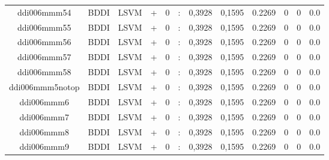 \documentclass[a4paper]{article}
\begin{document}
\begin{landscape}
\begin{center}
\begin{tabular}{ |c|c|c|c|c|c|c|c|c|c|c|c|}
 	
 
 	
 		
 		\small{ ddi006mmm54 } & BDDI & LSVM & +  &  0 &  :  &  0,3928 & 0,1595 & 0.2269  &  0 & 0 & 0.0 \\
 		

 	
 
 	
 		
 		\small{ ddi006mmm55 } & BDDI & LSVM & +  &  0 &  :  &  0,3928 & 0,1595 & 0.2269  &  0 & 0 & 0.0 \\
 		

 	
 
 	
 		
 		\small{ ddi006mmm56 } & BDDI & LSVM & +  &  0 &  :  &  0,3928 & 0,1595 & 0.2269  &  0 & 0 & 0.0 \\
 		

 	
 
 	
 		
 		\small{ ddi006mmm57 } & BDDI & LSVM & +  &  0 &  :  &  0,3928 & 0,1595 & 0.2269  &  0 & 0 & 0.0 \\
 		

 	
 
 	
 		
 		\small{ ddi006mmm58 } & BDDI & LSVM & +  &  0 &  :  &  0,3928 & 0,1595 & 0.2269  &  0 & 0 & 0.0 \\
 		

 	
 
 	
 		
 		\small{ ddi006mmm5notop } & BDDI & LSVM & +  &  0 &  :  &  0,3928 & 0,1595 & 0.2269  &  0 & 0 & 0.0 \\
 		

 	
 
 	
 		
 		\small{ ddi006mmm6 } & BDDI & LSVM & +  &  0 &  :  &  0,3928 & 0,1595 & 0.2269  &  0 & 0 & 0.0 \\
 		

 	
 
 	
 		
 		\small{ ddi006mmm7 } & BDDI & LSVM & +  &  0 &  :  &  0,3928 & 0,1595 & 0.2269  &  0 & 0 & 0.0 \\
 		

 	
 
 	
 		
 		\small{ ddi006mmm8 } & BDDI & LSVM & +  &  0 &  :  &  0,3928 & 0,1595 & 0.2269  &  0 & 0 & 0.0 \\
 		

 	
 
 	
 		
 		\small{ ddi006mmm9 } & BDDI & LSVM & +  &  0 &  :  &  0,3928 & 0,1595 & 0.2269  &  0 & 0 & 0.0 \\
 		


\end{tabular}
\end{center}
\end{landscape}
\end{document}
